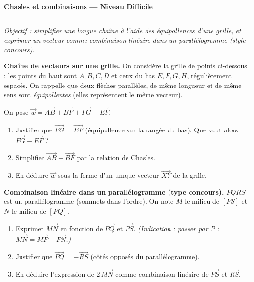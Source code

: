 \documentclass[11pt,a4paper]{article}
\newcommand{\vc}[1]{\overrightarrow{#1}}
\newcommand{\exo}[1]{\medskip\noindent{\color{primary}\bfseries\large Exercice #1.}\par\nopagebreak\smallskip}
\begin{document}
\begin{center}
{\LARGE\bfseries\color{primarydark}Chasles et combinaisons — Niveau Difficile}\\[2pt]
{\color{primary}\rule{0.5\linewidth}{1.1pt}}
\end{center}
\vspace{1mm}
{\small\itshape Objectif : simplifier une longue chaîne à l'aide des équipollences d'une grille, et
exprimer un vecteur comme combinaison linéaire dans un parallélogramme (style concours).}
\vspace{2mm}

\exo{1} \textbf{Chaîne de vecteurs sur une grille.}
On considère la grille de points ci-dessous : les points du haut sont $A,B,C,D$ et ceux du bas
$E,F,G,H$, régulièrement espacés. On rappelle que deux \og{}flèches\fg{} parallèles, de même longueur et
de même sens sont \emph{équipollentes} (elles représentent le même vecteur).

\begin{center}
\end{center}

On pose $\vec w=\vc{AB}+\vc{BF}+\vc{FG}-\vc{EF}$.
\begin{enumerate}[label=\textbf{\alph*)},leftmargin=2em,itemsep=3pt]
  \item Justifier que $\vc{FG}=\vc{EF}$ (équipollence sur la rangée du bas). Que vaut alors
        $\vc{FG}-\vc{EF}$ ?
  \item Simplifier $\vc{AB}+\vc{BF}$ par la relation de Chasles.
  \item En déduire $\vec w$ sous la forme d'un unique vecteur $\vc{XY}$ de la grille.
\end{enumerate}

\exo{2} \textbf{Combinaison linéaire dans un parallélogramme (type concours).}
$PQRS$ est un parallélogramme (sommets dans l'ordre). On note $M$ le milieu de $[PS]$ et $N$ le milieu
de $[PQ]$.
\begin{enumerate}[label=\textbf{\alph*)},leftmargin=2em,itemsep=3pt]
  \item Exprimer $\vc{MN}$ en fonction de $\vc{PQ}$ et $\vc{PS}$.
        \emph{(Indication : passer par $P$ : $\vc{MN}=\vc{MP}+\vc{PN}$.)}
  \item Justifier que $\vc{PQ}=-\vc{RS}$ (côtés opposés du parallélogramme).
  \item En déduire l'expression de $2\,\vc{MN}$ comme combinaison linéaire de $\vc{PS}$ et $\vc{RS}$.
\end{enumerate}
\end{document}
